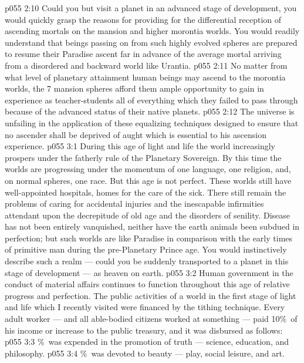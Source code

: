 \vs p055 2:10 Could you but visit a planet in an advanced stage of development, you would quickly grasp the reasons for providing for the differential reception of ascending mortals on the mansion and higher morontia worlds. You would readily understand that beings passing on from such highly evolved spheres are prepared to resume their Paradise ascent far in advance of the average mortal arriving from a disordered and backward world like Urantia.
\vs p055 2:11 No matter from what level of planetary attainment human beings may ascend to the morontia worlds, the 7 mansion spheres afford them ample opportunity to gain in experience as teacher\hyp{}students all of everything which they failed to pass through because of the advanced status of their native planets.
\vs p055 2:12 The universe is unfailing in the application of these equalizing techniques designed to ensure that no ascender shall be deprived of aught which is essential to his ascension experience.
\vs p055 3:1 During this age of light and life the world increasingly prospers under the fatherly rule of the Planetary Sovereign. By this time the worlds are progressing under the momentum of one language, one religion, and, on normal spheres, one race. But this age is not perfect. These worlds still have well\hyp{}appointed hospitals, homes for the care of the sick. There still remain the problems of caring for accidental injuries and the inescapable infirmities attendant upon the decrepitude of old age and the disorders of senility. Disease has not been entirely vanquished, neither have the earth animals been subdued in perfection; but such worlds are like Paradise in comparison with the early times of primitive man during the pre\hyp{}Planetary Prince age. You would instinctively describe such a realm --- could you be suddenly transported to a planet in this stage of development --- as heaven on earth.
\vs p055 3:2 \pc Human government in the conduct of material affairs continues to function throughout this age of relative progress and perfection. The public activities of a world in the first stage of light and life which I recently visited were financed by the tithing technique. Every adult worker --- and all able\hyp{}bodied citizens worked at something --- paid 10\%\ of his income or increase to the public treasury, and it was disbursed as follows:
\vs p055 3:3 \%\ was expended in the promotion of truth --- science, education, and philosophy.
\vs p055 3:4 \%\ was devoted to beauty --- play, social leisure, and art.
